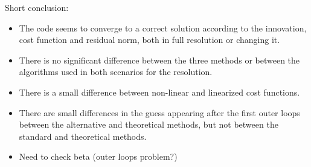 \documentclass[francais]{beamer}
\begin{document}
\begin{frame}{Short conclusion:}
\begin{itemize}
 \item The code seems to converge to a correct solution according to the innovation, cost function and residual norm, both in full resolution or changing it.
 \item There is no significant difference between the three methods or between the algorithms used in both scenarios for the resolution.
 \item There is a small difference between non-linear and linearized cost functions.
 \item There are small differences in the guess appearing after the first outer loops between the alternative and theoretical methods, but not between the standard and theoretical methods.
 \item Need to check beta (outer loops problem?)
\end{itemize}
\end{frame}






\usebackgroundtemplate{}
\end{document}
